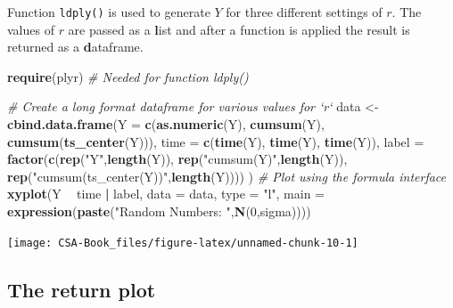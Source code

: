 \documentclass[12pt,]{book}
\newenvironment{Shaded}{\begin{snugshade}}{\end{snugshade}}
\newcommand{\CommentTok}[1]{\textcolor[rgb]{0.56,0.35,0.01}{\textit{#1}}}
\newcommand{\DataTypeTok}[1]{\textcolor[rgb]{0.13,0.29,0.53}{#1}}
\newcommand{\DecValTok}[1]{\textcolor[rgb]{0.00,0.00,0.81}{#1}}
\newcommand{\KeywordTok}[1]{\textcolor[rgb]{0.13,0.29,0.53}{\textbf{#1}}}
\newcommand{\NormalTok}[1]{#1}
\newcommand{\OperatorTok}[1]{\textcolor[rgb]{0.81,0.36,0.00}{\textbf{#1}}}
\newcommand{\StringTok}[1]{\textcolor[rgb]{0.31,0.60,0.02}{#1}}
\begin{document}
Function \texttt{ldply()} is used to generate \(Y\) for three different settings of \(r\). The values of \(r\) are passed as a \textbf{l}ist and after a function is applied the result is returned as a \textbf{d}ataframe.

\begin{Shaded}
\begin{Highlighting}[]
\KeywordTok{require}\NormalTok{(plyr)          }\CommentTok{# Needed for function ldply()}

\CommentTok{# Create a long format dataframe for various values for `r`}
\NormalTok{data <-}\StringTok{ }\KeywordTok{cbind.data.frame}\NormalTok{(}\DataTypeTok{Y     =} \KeywordTok{c}\NormalTok{(}\KeywordTok{as.numeric}\NormalTok{(Y), }\KeywordTok{cumsum}\NormalTok{(Y), }\KeywordTok{cumsum}\NormalTok{(}\KeywordTok{ts_center}\NormalTok{(Y))),}
                         \DataTypeTok{time  =} \KeywordTok{c}\NormalTok{(}\KeywordTok{time}\NormalTok{(Y), }\KeywordTok{time}\NormalTok{(Y), }\KeywordTok{time}\NormalTok{(Y)),}
                         \DataTypeTok{label =} \KeywordTok{factor}\NormalTok{(}\KeywordTok{c}\NormalTok{(}\KeywordTok{rep}\NormalTok{(}\StringTok{"Y"}\NormalTok{,}\KeywordTok{length}\NormalTok{(Y)),  }\KeywordTok{rep}\NormalTok{(}\StringTok{"cumsum(Y)"}\NormalTok{,}\KeywordTok{length}\NormalTok{(Y)), }\KeywordTok{rep}\NormalTok{(}\StringTok{"cumsum(ts_center(Y))"}\NormalTok{,}\KeywordTok{length}\NormalTok{(Y))))}
\NormalTok{                         )}
\CommentTok{# Plot using the formula interface}
\KeywordTok{xyplot}\NormalTok{(Y }\OperatorTok{~}\StringTok{ }\NormalTok{time }\OperatorTok{|}\StringTok{ }\NormalTok{label, }\DataTypeTok{data =}\NormalTok{ data, }\DataTypeTok{type =} \StringTok{"l"}\NormalTok{, }\DataTypeTok{main =} \KeywordTok{expression}\NormalTok{(}\KeywordTok{paste}\NormalTok{(}\StringTok{"Random Numbers: "}\NormalTok{,}\KeywordTok{N}\NormalTok{(}\DecValTok{0}\NormalTok{,sigma))))}
\end{Highlighting}
\end{Shaded}

\begin{center}\texttt{[image: CSA-Book\_files/figure-latex/unnamed-chunk-10-1]} \end{center}

\hypertarget{the-return-plot}{%
\subsection{The return plot}\label{the-return-plot}}
\end{document}
